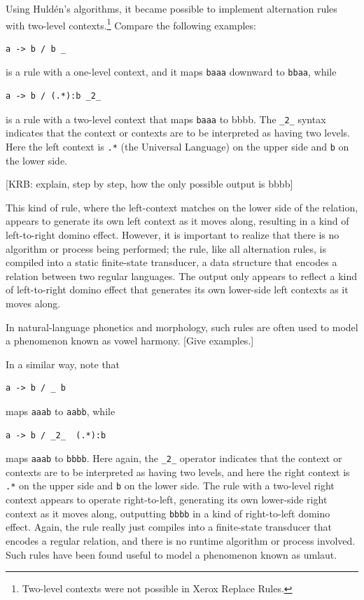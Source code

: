 Using Huld\'en's algorithms, it became possible to implement alternation rules with two-level contexts.\footnote{Two-level contexts
were not possible in Xerox Replace Rules.}
Compare the following examples:

\begin{Verbatim}
a -> b / b _
\end{Verbatim}

\noindent
is a rule with a one-level context, and it maps \texttt{baaa} downward to \texttt{bbaa}, while

\begin{Verbatim}
a -> b / (.*):b _2_
\end{Verbatim}

\noindent
is a rule with a two-level context that maps \texttt{baaa} to {bbbb}.  The
\verb!_2_! syntax indicates that the context or contexts are to be interpreted as
having two levels.  Here the left context is \verb!.*! (the Universal Language) on the upper side and \verb!b! on the
lower side.

[KRB:  explain, step by step, how the only possible output is bbbb]

This kind of rule, where the left-context matches on
the lower side of the relation, appears to generate its own left context as it moves
along, resulting in a kind of left-to-right domino effect.  However, it is
important to realize that there is no algorithm or process being performed; the rule,
like all alternation rules, is compiled into a static finite-state transducer, a data
structure that encodes a
relation between two regular languages.  The output only appears to reflect a kind of
left-to-right domino effect that generates its own lower-side left contexts as it
moves along.

In natural-language phonetics and morphology, such rules are often used to model a phenomenon known
as vowel harmony.  [Give examples.]

In a similar way, note that

\begin{Verbatim}
a -> b / _ b
\end{Verbatim}

\noindent
maps \texttt{aaab} to \texttt{aabb}, while

\begin{Verbatim}
a -> b / _2_  (.*):b
\end{Verbatim}

\noindent
maps \texttt{aaab} to \texttt{bbbb}.  Here again, the \verb!_2_! operator indicates that the context or contexts are to
be interpreted as having two levels, and here the right context is \verb!.*! on the upper side and \verb!b! on the lower
side.  The rule with a two-level right context appears to
operate right-to-left, generating its own lower-side right context as it moves along, outputting \texttt{bbbb} in a kind
of right-to-left domino effect.
Again, the rule really just compiles into a finite-state transducer that encodes a regular
relation, and there is no runtime algorithm or process involved.
Such rules have been found useful to model a phenomenon known as umlaut.

